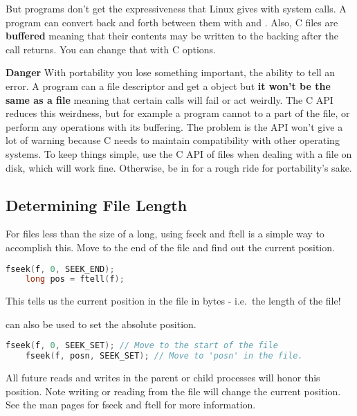 But programs don't get the expressiveness that Linux gives with system calls.
A program can convert back and forth between them with  and .
Also, C files are \textbf{buffered} meaning that their contents may be written to the backing after the call returns.
You can change that with C options.
	 
\textbf{Danger} With portability you lose something important, the ability to tell an error.
A program can  a file descriptor and get a  object but \textbf{it won't be the same as a file} meaning that certain calls will fail or act weirdly.
The C API reduces this weirdness, but for example a program cannot  to a part of the file, or perform any operations with its buffering.
The problem is the API won't give a lot of warning because C needs to maintain compatibility with other operating systems.
To keep things simple, use the C API of files when dealing with a file on disk, which will work fine. Otherwise, be in for a rough ride for portability's sake.
	 
\subsection{Determining File Length}
	 
For files less than the size of a long, using fseek and ftell is a
simple way to accomplish this.
Move to the end of the file and find out the current position.
	 
\begin{lstlisting}[language=C]
	fseek(f, 0, SEEK_END);
	long pos = ftell(f);
\end{lstlisting}
	 
This tells us the current position in the file in bytes - i.e.~the
length of the file!
	 
 can also be used to set the absolute position.
	 
\begin{lstlisting}[language=C]
	fseek(f, 0, SEEK_SET); // Move to the start of the file
	fseek(f, posn, SEEK_SET); // Move to 'posn' in the file.
\end{lstlisting}
	 
All future reads and writes in the parent or child processes will honor this position.
Note writing or reading from the file will change the current position.
See the man pages for fseek and ftell for more information.
	 
